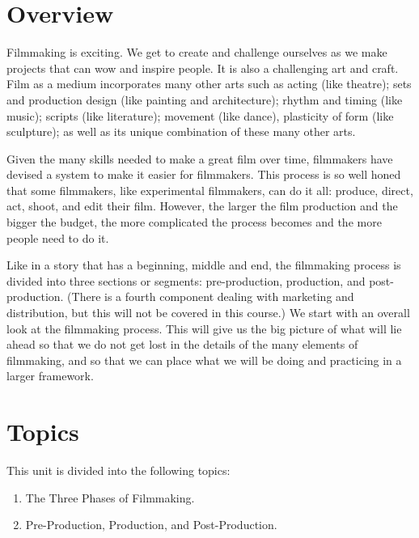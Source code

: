 \documentclass[
]{book}
\providecommand{\tightlist}{%
  \setlength{\itemsep}{0pt}\setlength{\parskip}{0pt}}
\begin{document}
\hypertarget{overview-1}{%
\section*{Overview}\label{overview-1}}

Filmmaking is exciting. We get to create and challenge ourselves as we make projects that can wow and inspire people. It is also a challenging art and craft. Film as a medium incorporates many other arts such as acting (like theatre); sets and production design (like painting and architecture); rhythm and timing (like music); scripts (like literature); movement (like dance), plasticity of form (like sculpture); as well as its unique combination of these many other arts.

Given the many skills needed to make a great film over time, filmmakers have devised a system to make it easier for filmmakers. This process is so well honed that some filmmakers, like experimental filmmakers, can do it all: produce, direct, act, shoot, and edit their film. However, the larger the film production and the bigger the budget, the more complicated the process becomes and the more people need to do it.

Like in a story that has a beginning, middle and end, the filmmaking process is divided into three sections or segments: pre-production, production, and post-production. (There is a fourth component dealing with marketing and distribution, but this will not be covered in this course.) We start with an overall look at the filmmaking process. This will give us the big picture of what will lie ahead so that we do not get lost in the details of the many elements of filmmaking, and so that we can place what we will be doing and practicing in a larger framework.

\hypertarget{topics-1}{%
\section*{Topics}\label{topics-1}}

This unit is divided into the following topics:

\begin{enumerate}
\def\labelenumi{\arabic{enumi}.}
\tightlist
\item
  The Three Phases of Filmmaking.
\item
  Pre-Production, Production, and Post-Production.
\end{enumerate}
\end{document}
